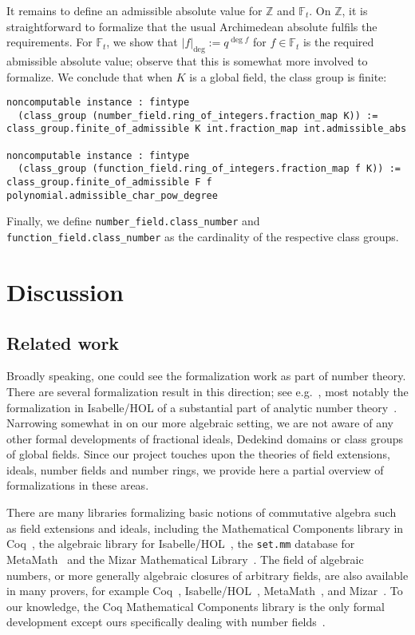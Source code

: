\documentclass[a4paper,USenglish,cleveref, autoref, thm-restate]{lipics-v2021}
\newcommand{\lean}[1]{\texttt{#1}\xspace} %
\newcommand*{\Fq}[1][q]{\mathbb{F}_{#1}}
\newcommand{\Z}{\mathbb{Z}}
\begin{document}
It remains to define an admissible absolute value for $\Z$ and $\Fq[t]$. On $\Z$, it is straightforward to formalize that the usual Archimedean absolute fulfils the requirements. For $\Fq[t]$, we show that $\lvert f\rvert_{\deg}:=q^{\deg f}$ for $f \in \Fq[t]$ is the required abmissible absolute value; observe that this is somewhat more involved to formalize.
We conclude that when $K$ is a global field, the class group is finite:
\begin{lstlisting}
noncomputable instance : fintype
  (class_group (number_field.ring_of_integers.fraction_map K)) :=
class_group.finite_of_admissible K int.fraction_map int.admissible_abs

noncomputable instance : fintype
  (class_group (function_field.ring_of_integers.fraction_map f K)) :=
class_group.finite_of_admissible F f polynomial.admissible_char_pow_degree
\end{lstlisting}

Finally, we define \lean{number\_field.class\_number} and \lean{function\_field.class\_number} as the cardinality of the respective class groups.

\section{Discussion}

\subsection{Related work}

Broadly speaking, one could see the formalization work as part of number theory. There are several formalization result in this direction; see e.g.~\cite[Section 6]{CapSetProblem}, most notably the formalization in Isabelle/HOL of a substantial part of analytic number theory~\cite{Eberl19}.
Narrowing somewhat in on our more algebraic setting, we are not aware of any other formal developments of fractional ideals, Dedekind domains or class groups of global fields.
Since our project touches upon the theories of field extensions, ideals, number fields and number rings,
we provide here a partial overview of formalizations in these areas.

There are many libraries formalizing basic notions of commutative algebra such as field extensions and ideals, including the Mathematical Components library in Coq~\cite{mathcomp}, the algebraic library for Isabelle/HOL~\cite{algebra_isabelle}, the \texttt{set.mm} database for MetaMath~\cite{metamath} and the Mizar Mathematical Library~\cite{algebraic-hierarchy_mizar}. The field of algebraic numbers, or more generally algebraic closures of arbitrary fields, are also available in many provers, for example Coq~\cite{real-algebraic-numbers-coq, mathcomp}, Isabelle/HOL~\cite{algebraic-numbers-isabelle}, MetaMath~\cite{algebraic-numbers-metamath}, and Mizar~\cite{algebraic-numbers-mizar}. To our knowledge, the Coq Mathematical Components library is the only formal development except ours specifically dealing with number fields~\cite[\texttt{field/algnum.v}]{mathcomp}.
\end{document}
